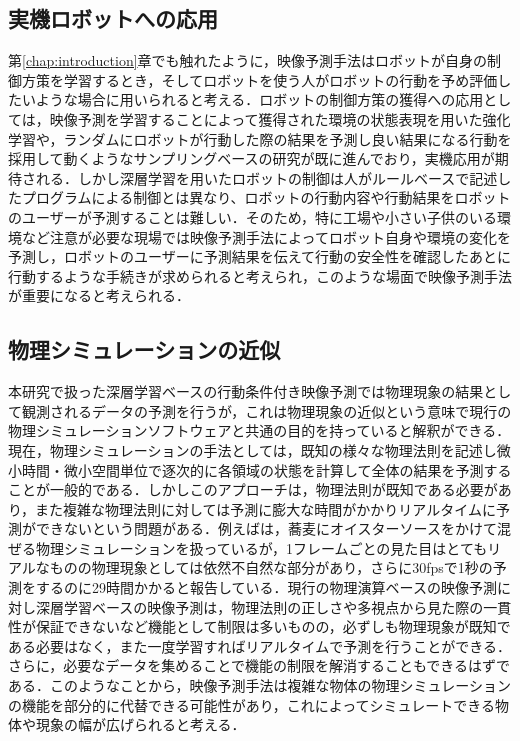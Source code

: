 \subsection{実機ロボットへの応用}
第\ref{chap:introduction}章でも触れたように，映像予測手法はロボットが自身の制御方策を学習するとき，そしてロボットを使う人がロボットの行動を予め評価したいような場合に用いられると考える．ロボットの制御方策の獲得への応用としては，映像予測を学習することによって獲得された環境の状態表現を用いた強化学習や，ランダムにロボットが行動した際の結果を予測し良い結果になる行動を採用して動くようなサンプリングベースの研究が既に進んでおり，実機応用が期待される．しかし深層学習を用いたロボットの制御は人がルールベースで記述したプログラムによる制御とは異なり、ロボットの行動内容や行動結果をロボットのユーザーが予測することは難しい．そのため，特に工場や小さい子供のいる環境など注意が必要な現場では映像予測手法によってロボット自身や環境の変化を予測し，ロボットのユーザーに予測結果を伝えて行動の安全性を確認したあとに行動するような手続きが求められると考えられ，このような場面で映像予測手法が重要になると考えられる．

\subsection{物理シミュレーションの近似}

本研究で扱った深層学習ベースの行動条件付き映像予測では物理現象の結果として観測されるデータの予測を行うが，これは物理現象の近似という意味で現行の物理シミュレーションソフトウェアと共通の目的を持っていると解釈ができる．現在，物理シミュレーションの手法としては，既知の様々な物理法則を記述し微小時間・微小空間単位で逐次的に各領域の状態を計算して全体の結果を予測することが一般的である．しかしこのアプローチは，物理法則が既知である必要があり，また複雑な物理法則に対しては予測に膨大な時間がかかりリアルタイムに予測ができないという問題がある．例えば\cite{fei2019multi}は，蕎麦にオイスターソースをかけて混ぜる物理シミュレーションを扱っているが，1フレームごとの見た目はとてもリアルなものの物理現象としては依然不自然な部分があり，さらに30fpsで1秒の予測をするのに29時間かかると報告している．現行の物理演算ベースの映像予測に対し深層学習ベースの映像予測は，物理法則の正しさや多視点から見た際の一貫性が保証できないなど機能として制限は多いものの，必ずしも物理現象が既知である必要はなく，また一度学習すればリアルタイムで予測を行うことができる．さらに，必要なデータを集めることで機能の制限を解消することもできるはずである．このようなことから，映像予測手法は複雑な物体の物理シミュレーションの機能を部分的に代替できる可能性があり，これによってシミュレートできる物体や現象の幅が広げられると考える．

